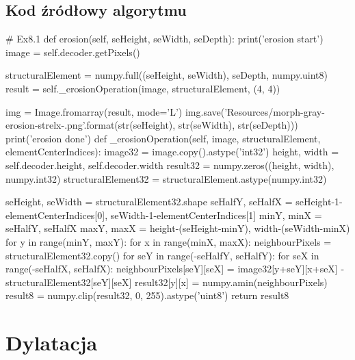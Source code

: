 \documentclass[a4paper,12pt]{book}
\begin{document}
\subsection{Kod źródłowy algorytmu}
\begin{python}
# Ex8.1
def erosion(self, seHeight, seWidth, seDepth):
	print('erosion start')
	image = self.decoder.getPixels()
	
	structuralElement = numpy.full((seHeight, seWidth), seDepth, numpy.uint8)
	result = self._erosionOperation(image, structuralElement, (4, 4))
	
	img = Image.fromarray(result, mode='L')
	img.save('Resources/morph-gray-erosion-strel{}x{}-{}.png'.format(str(seHeight), str(seWidth), str(seDepth)))
	print('erosion done')
def _erosionOperation(self, image, structuralElement, elementCenterIndices):
	image32 = image.copy().astype('int32')
	height, width = self.decoder.height, self.decoder.width
	result32 = numpy.zeros((height, width), numpy.int32)
	structuralElement32 = structuralElement.astype(numpy.int32)
	
	seHeight, seWidth = structuralElement32.shape
	seHalfY, seHalfX = seHeight-1-elementCenterIndices[0], seWidth-1-elementCenterIndices[1]
	minY, minX = seHalfY, seHalfX
	maxY, maxX = height-(seHeight-minY), width-(seWidth-minX)
	for y in range(minY, maxY):
		for x in range(minX, maxX):
			neighbourPixels = structuralElement32.copy()
			for seY in range(-seHalfY, seHalfY):
				for seX in range(-seHalfX, seHalfX):
					neighbourPixels[seY][seX] = image32[y+seY][x+seX] - structuralElement32[seY][seX]
			result32[y][x] = numpy.amin(neighbourPixels)
	result8 = numpy.clip(result32, 0, 255).astype('uint8')
	return result8
\end{python}
\section{Dylatacja}
\end{document}
